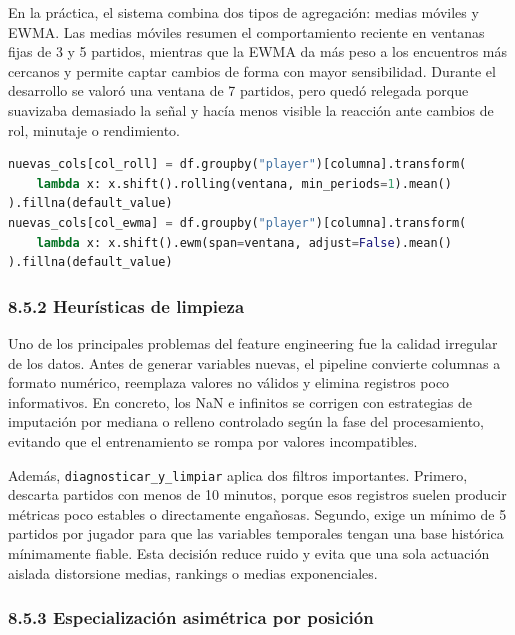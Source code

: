 En la práctica, el sistema combina dos tipos de agregación: medias móviles y EWMA. Las medias móviles resumen el comportamiento reciente en ventanas fijas de 3 y 5 partidos,
 mientras que la EWMA da más peso a los encuentros más cercanos y permite captar cambios de forma con mayor sensibilidad. Durante el desarrollo se valoró una ventana de 7 partidos,
  pero quedó relegada porque suavizaba demasiado la señal y hacía menos visible la reacción ante cambios de rol, minutaje o rendimiento.

\begin{lstlisting}[language=Python,caption={Agregación temporal con medias móviles y EWMA para capturar evolución de jugadores}]
nuevas_cols[col_roll] = df.groupby("player")[columna].transform(
    lambda x: x.shift().rolling(ventana, min_periods=1).mean()
).fillna(default_value)
nuevas_cols[col_ewma] = df.groupby("player")[columna].transform(
    lambda x: x.shift().ewm(span=ventana, adjust=False).mean()
).fillna(default_value)
\end{lstlisting}

\subsubsection{8.5.2 Heurísticas de limpieza}

Uno de los principales problemas del feature engineering fue la calidad irregular de los datos. Antes de generar variables nuevas, el pipeline 
convierte columnas a formato numérico, reemplaza valores no válidos y elimina registros poco informativos. En concreto, los NaN e infinitos se 
corrigen con estrategias de imputación por mediana o relleno controlado según la fase del procesamiento, evitando que el entrenamiento se rompa 
por valores incompatibles.

Además, \texttt{diagnosticar\_y\_limpiar} aplica dos filtros importantes. Primero, descarta partidos con menos de 10 minutos, porque esos registros
 suelen producir métricas poco estables o directamente engañosas. Segundo, exige un mínimo de 5 partidos por jugador para que las variables temporales 
 tengan una base histórica mínimamente fiable. Esta decisión reduce ruido y evita que una sola actuación aislada distorsione medias, rankings o medias exponenciales.

\subsubsection{8.5.3 Especialización asimétrica por posición}

